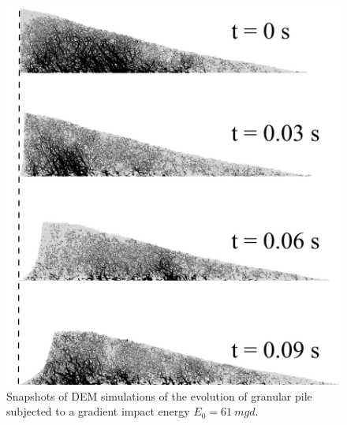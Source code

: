 \begin{figure}[tbph]
\centering
\includegraphics[width=\textwidth]{Uniform_Slope_DEM_200J}
\caption{Snapshots of DEM simulations of the evolution of granular pile 
subjected to a gradient impact energy $E_0 = 61 \ mgd$.}
\label{fig:Uniform_Slope_DEM_200J}
\end{figure}

